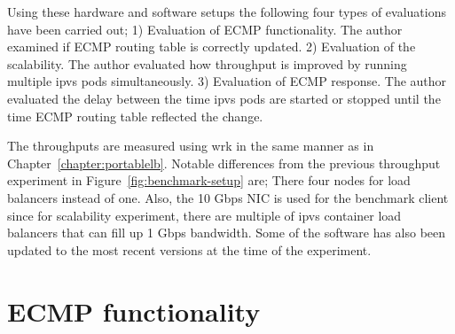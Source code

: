 Using these hardware and software setups the following four types of evaluations have been carried out;
1) Evaluation of ECMP functionality. The author examined if ECMP routing table is correctly updated.
2) Evaluation of the scalability. The author evaluated how throughput is improved by running multiple ipvs pods simultaneously.
3) Evaluation of ECMP response. The author evaluated the delay between the time ipvs pods are started or stopped until the time ECMP routing table reflected the change.


The throughputs are measured using wrk in the same manner as in Chapter~\ref{chapter:portablelb}.
Notable differences from the previous throughput experiment in Figure~\ref{fig:benchmark-setup} are;
There four nodes for load balancers instead of one.
Also, the 10 Gbps NIC is used for the benchmark client since for scalability experiment, there are multiple of ipvs container load balancers that can fill up 1 Gbps bandwidth.
Some of the software has also been updated to the most recent versions at the time of the experiment.

\FloatBarrier

\section{ECMP functionality}

